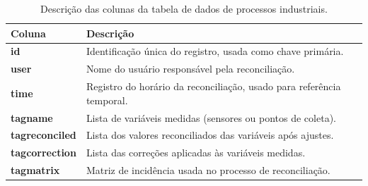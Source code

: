 \begin{table}[htbp!]
    \centering
    \label{tab:processDataTable}
    \begin{tabular}{|l|p{10cm}|}
        \hline
        \textbf{Coluna} & \textbf{Descrição} \\ \hline
        \textbf{id} & Identificação única do registro, usada como chave primária. \\ \hline
        \textbf{user} & Nome do usuário responsável pela reconciliação. \\ \hline
        \textbf{time} & Registro do horário da reconciliação, usado para referência temporal. \\ \hline
        \textbf{tagname} & Lista de variáveis medidas (sensores ou pontos de coleta). \\ \hline
        \textbf{tagreconciled} & Lista dos valores reconciliados das variáveis após ajustes. \\ \hline
        \textbf{tagcorrection} & Lista das correções aplicadas às variáveis medidas. \\ \hline
        \textbf{tagmatrix} & Matriz de incidência usada no processo de reconciliação. \\ \hline
    \end{tabular}
    \caption{Descrição das colunas da tabela de dados de processos industriais.}
\end{table}
